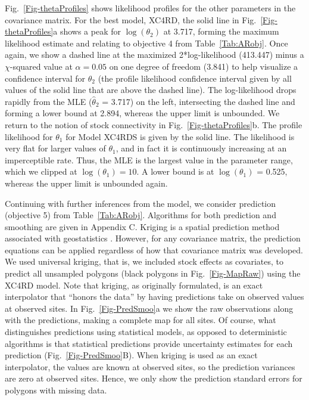 \documentclass[11pt, titlepage]{article}\usepackage[]{graphicx}\usepackage[]{color}
\begin{document}
\begin{spacing}{1.9}
\begin{flushleft}
Fig.~\ref{Fig-thetaProfiles} shows likelihood profiles for the other parameters in the covariance matrix.  For the best model, XC4RD, the solid line in Fig.~\ref{Fig-thetaProfiles}a shows a peak for $\log(\theta_2)$ at 3.717, forming the maximum likelihood estimate and relating to objective 4 from Table~\ref{Tab:ARobj}. Once again, we show a dashed line at the maximized 2*log-likelihood (413.447) minus a $\chi$-squared value at $\alpha = 0.05$ on one degree of freedom (3.841) to help visualize a confidence interval for $\theta_2$ (the profile likelihood confidence interval given by all values of the solid line that are above the dashed line). The log-likelihood drops rapidly from the MLE ($\hat{\theta}_2$ = 3.717) on the left, intersecting the dashed line and forming a lower bound at 2.894, whereas the upper limit is unbounded. We return to the notion of stock connectivity in Fig.~\ref{Fig-thetaProfiles}b.  The profile likelihood for $\theta_1$ for Model XC4RDS is given by the solid line. The likelihood is very flat for larger values of $\theta_1$, and in fact it is continuously increasing at an imperceptible rate. Thus, the MLE is the largest value in the parameter range, which we clipped at $\log(\theta_1) = 10$. A lower bound is at $\log(\theta_1)$ = 0.525, whereas the upper limit is unbounded again.

Continuing with further inferences from the model, we consider prediction (objective 5) from Table~\ref{Tab:ARobj}. Algorithms for both prediction and smoothing are given in Appendix C.  Kriging is a spatial prediction method associated with geostatistics \citep{Cres:orig:1990}.  However, for any covariance matrix, the prediction equations can be applied regardless of how that covariance matrix was developed.  We used universal kriging, that is, we included stock effects as covariates, \citep[][pg. 151]{Huij:Math:univ:1971,Cres:stat:1993} to predict all unsampled polygons (black polygons in Fig.~\ref{Fig-MapRaw}) using the XC4RD model. Note that kriging, as originally formulated, is an exact interpolator \citep[pg. 129]{Cres:stat:1993} that ``honors the data'' \citep[p. 252]{Scha:Gotw:stat:2005} by having predictions take on observed values at observed sites.  In Fig.~\ref{Fig-PredSmoo}a we show the raw observations along with the predictions, making a complete map for all sites. Of course, what distinguishes predictions using statistical models, as opposed to deterministic algorithms \citep[e.g., inverse distance weighted,][]{Shep:two:1968} is that statistical predictions provide uncertainty estimates for each prediction (Fig.~\ref{Fig-PredSmoo}B).  When kriging is used as an exact interpolator, the values are known at observed sites, so the prediction variances are zero at observed sites.  Hence, we only show the prediction standard errors for polygons with missing data.  


\end{flushleft}
\end{spacing}
\end{document}
